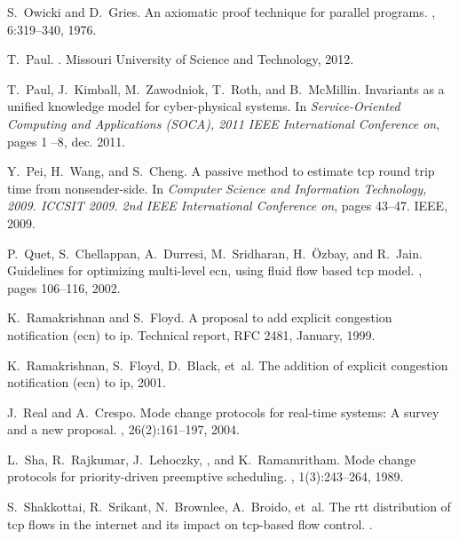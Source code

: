 \documentclass{sig-alternate-ipsn09}
\begin{document}
\begin{thebibliography}{10}
S.~Owicki and D.~Gries.
\newblock An axiomatic proof technique for parallel programs.
, 6:319--340, 1976.

T.~Paul.
.
\newblock Missouri University of Science and Technology, 2012.

T.~Paul, J.~Kimball, M.~Zawodniok, T.~Roth, and B.~McMillin.
\newblock Invariants as a unified knowledge model for cyber-physical systems.
\newblock In {\em Service-Oriented Computing and Applications (SOCA), 2011 IEEE
  International Conference on}, pages 1 --8, dec. 2011.



Y.~Pei, H.~Wang, and S.~Cheng.
\newblock A passive method to estimate tcp round trip time from nonsender-side.
\newblock In {\em Computer Science and Information Technology, 2009. ICCSIT
  2009. 2nd IEEE International Conference on}, pages 43--47. IEEE, 2009.



P.~Quet, S.~Chellappan, A.~Durresi, M.~Sridharan, H.~{\"O}zbay, and R.~Jain.
\newblock Guidelines for optimizing multi-level ecn, using fluid flow based tcp
  model.
, pages 106--116, 2002.


K.~Ramakrishnan and S.~Floyd.
\newblock A proposal to add explicit congestion notification (ecn) to ip.
\newblock Technical report, RFC 2481, January, 1999.

K.~Ramakrishnan, S.~Floyd, D.~Black, et~al.
\newblock The addition of explicit congestion notification (ecn) to ip, 2001.

J.~Real and A.~Crespo.
\newblock Mode change protocols for real-time systems: A survey and a new
  proposal.
, 26(2):161--197, 2004.

L.~Sha, R.~Rajkumar, J.~Lehoczky, , and K.~Ramamritham.
\newblock Mode change protocols for priority-driven preemptive scheduling.
, 1(3):243--264, 1989.

S.~Shakkottai, R.~Srikant, N.~Brownlee, A.~Broido, et~al.
\newblock The rtt distribution of tcp flows in the internet and its impact on
  tcp-based flow control.
.


\end{thebibliography}
\end{document}
